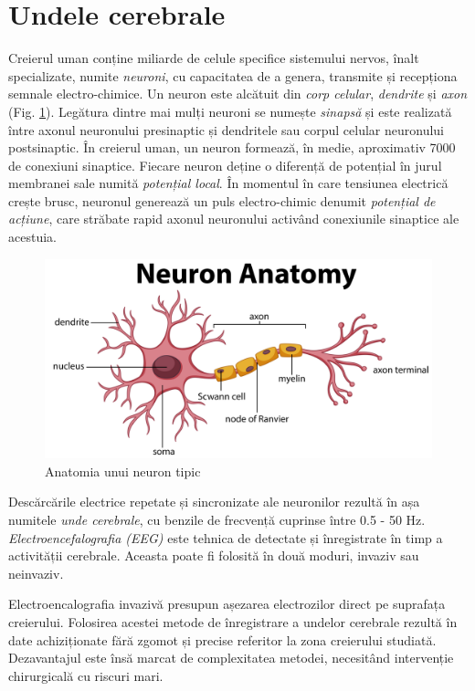 \section{Undele cerebrale}
Creierul uman conține miliarde de celule specifice sistemului nervos, înalt specializate, numite \textit{neuroni}, cu capacitatea de a genera, transmite și recepționa semnale electro-chimice. Un neuron este alcătuit din \textit{corp celular}, \textit{dendrite} și \textit{axon} (Fig. \ref{fig:neuron-anatomy}). Legătura dintre mai mulți neuroni se numește \textit{sinapsă} și este realizată între axonul neuronului presinaptic și dendritele sau corpul celular neuronului postsinaptic. În creierul uman, un neuron formează, în medie, aproximativ 7000 de conexiuni sinaptice. Fiecare neuron deține o diferență de potențial în jurul membranei sale numită \textit{potențial local}. În momentul în care tensiunea electrică crește brusc, neuronul generează un puls electro-chimic denumit \textit{potențial de acțiune}, care străbate rapid axonul neuronului activând conexiunile sinaptice ale acestuia.
\begin{figure}[ht]
\centering
\includegraphics[width=\textwidth, keepaspectratio]{fig/cap2/neuron-anatomy.jpg}
\caption{Anatomia unui neuron tipic \cite{online:neuron-anatomy}}
\label{fig:neuron-anatomy}
\end{figure}

Descărcările electrice repetate și sincronizate ale neuronilor rezultă în așa numitele \textit{unde cerebrale}, cu benzile de frecvență cuprinse între 0.5 - 50 \si{\hertz}. \textit{Electroencefalografia (EEG)} este tehnica de detectate și înregistrate în timp a activității cerebrale. Aceasta poate fi folosită în două moduri, invaziv sau neinvaziv. 

Electroencalografia invazivă presupun așezarea electrozilor direct pe suprafața creierului. Folosirea acestei metode de înregistrare a undelor cerebrale rezultă în date achiziționate fără zgomot și precise referitor la zona creierului studiată. Dezavantajul este însă marcat de complexitatea metodei, necesitând intervenție chirurgicală cu riscuri mari.

